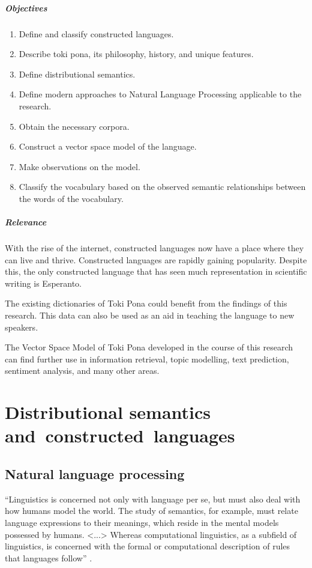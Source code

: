 \documentclass[14pt, a4paper]{extreport}
\begin{document}
\paragraph{Objectives}

\begin{enumerate}
  \item Define and classify constructed languages.
  \item Describe toki pona, its philosophy, history, and unique features.
  \item Define distributional semantics.
  \item Define modern approaches to Natural Language Processing applicable to the research.
  \item Obtain the necessary corpora.
  \item Construct a vector space model of the language.
  \item Make observations on the model.
  \item Classify the vocabulary based on the observed semantic relationships between the words of the vocabulary.
\end{enumerate}


\paragraph{Relevance}

With the rise of the internet, constructed languages now have a place where they can live and thrive. Constructed languages are rapidly gaining popularity. Despite this, the only constructed language that has seen much representation in scientific writing is Esperanto.

The existing dictionaries of Toki Pona could benefit from the findings of this research. This data can also be used as an aid in teaching the language to new speakers.

The Vector Space Model of Toki Pona developed in the course of this research can find further use in information retrieval, topic modelling, text prediction, sentiment analysis, and many other areas.



\chapter{Distributional semantics and~constructed~languages}

\section{Natural language processing}
``Linguistics is concerned not only with language per se, but must also deal with how humans model the world. The study of semantics, for example, must relate language expressions to their meanings, which reside in the mental models possessed by humans. <...> Whereas computational linguistics, as a subfield of linguistics, is concerned with the formal or computational description of rules that languages follow'' \parencite{nlpandcl}.
\end{document}
